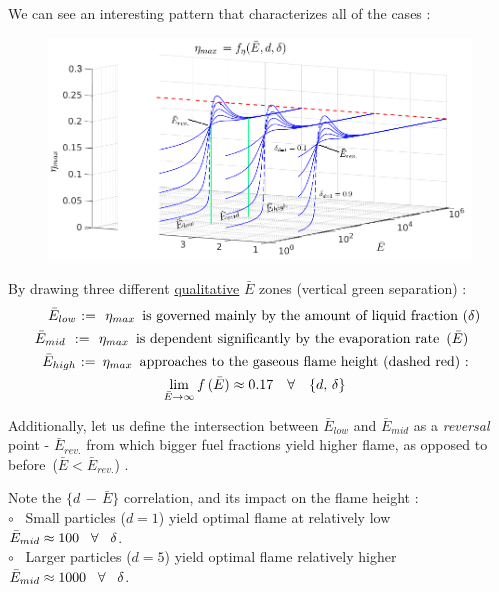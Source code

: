 \documentclass[12pt]{article}
\numberwithin{equation}{section}
\begin{document}
\begin{flushleft}
We can see an interesting pattern that characterizes all of the cases :
\begin{figure}[H] 
\centering
\includegraphics[width=0.975 \linewidth, center]{p_dist_mid.png}
\end{figure}
By drawing three different \underline{qualitative} $\bar{E}$ zones (vertical green separation) : 
\begin{align}
\text{\hspace{2.5mm}$\bar{E}_{low}$ := \ $\eta_{max}$\, is governed mainly by the amount of liquid fraction ($\delta$) } \label{E_low} \\
\text{$\bar{E}_{mid}$ \ := \ $\eta_{max}$\, is dependent significantly by the evaporation rate \,($\bar{E}$) } \hspace{3mm}  \label{E_mid} \\
\text{$\bar{E}_{high}$ := \,$\eta_{max}$\, approaches to the gaseous flame height (dashed red) : } \hspace{2.5mm}  \label{E_high} \\
\lim_{\bar{E}\rightarrow \infty} f\, (\bar{E}) \approx 0.17 \quad \forall \quad \{ d, \, \delta \} \hspace{35mm} \notag
\end{align}

Additionally, let us define the intersection between $\bar{E}_{low}$ and $\bar{E}_{mid}$ as a \textit{reversal} point - $\bar{E}_{rev.}$ from which bigger fuel fractions yield higher flame, as opposed to before \,($\bar{E} < \bar{E}_{rev.}$) . 

Note the $\{ d \, - \, \bar{E} \}$ correlation, and its impact on the flame height : \\
\quad $\circ$ \ Small particles ($d=1$) yield optimal flame at relatively low \, $\bar{E}_{mid} \approx 100 \hspace{3mm} \forall \hspace{3mm} \delta$. \\
\quad $\circ$ \ Larger particles ($d=5$) yield optimal flame relatively higher $\bar{E}_{mid}  \approx 1000 \hspace{3mm} \forall \hspace{3mm} \delta$. 


\end{flushleft}
\end{document}
